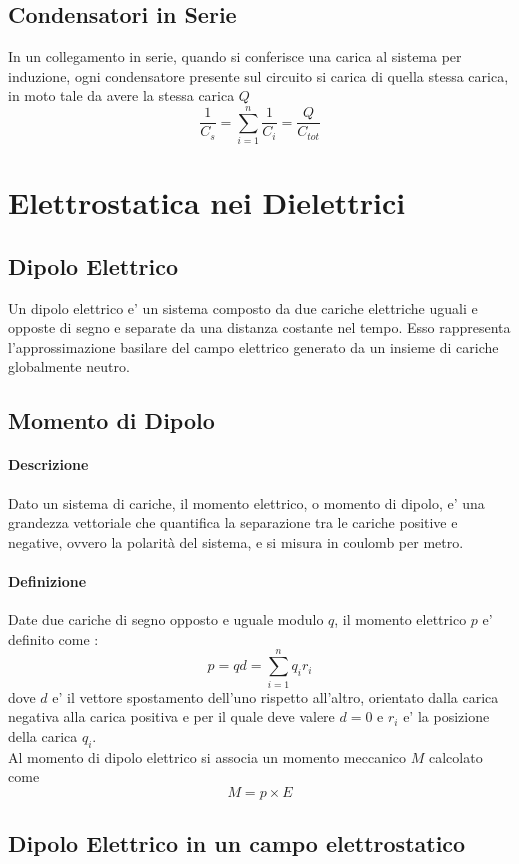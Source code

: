 \documentclass[a4paper, 10pt]{article}
\begin{document}
		\subsection{Condensatori in Serie}
			In un collegamento in serie, quando si conferisce una carica al sistema per induzione, 
			ogni condensatore presente sul circuito si carica di quella stessa carica, in moto tale da avere la stessa carica $Q$
			\[ \frac{1}{C_{s}} = \sum_{i = 1}^n \frac{1}{C_i} = \frac{Q}{C_{tot}}\]
			
	\newpage
	\section{Elettrostatica nei Dielettrici} 
		\subsection{Dipolo Elettrico}
			Un dipolo elettrico e' un sistema composto da due cariche elettriche uguali e opposte di segno e separate da una
			distanza costante nel tempo. Esso rappresenta l'approssimazione basilare del campo elettrico generato da un insieme 
			di cariche globalmente neutro.
		\subsection{Momento di Dipolo}
			\paragraph*{Descrizione}
			Dato un sistema di cariche, il momento elettrico, o momento di dipolo, e' una grandezza vettoriale che 
			quantifica la separazione tra le cariche positive e negative, ovvero la polarità del sistema, e si misura 
			in coulomb per metro.
			\paragraph*{Definizione}
			Date due cariche di segno opposto e uguale modulo $q$, il momento elettrico $p$ e' definito come :
			\[ p = qd = \sum_{i=1}^n q_i r_i \]
			dove $d$ e' il vettore spostamento dell'uno rispetto all'altro, orientato dalla carica negativa alla carica
			positiva e per il quale deve valere $d = 0$ e $r_i$ e' la posizione della carica $q_i$. \\
			Al momento di dipolo elettrico si associa un momento meccanico $M$ calcolato come \[ M = p \times E \]
		\subsection{Dipolo Elettrico in un campo elettrostatico}
\end{document}
